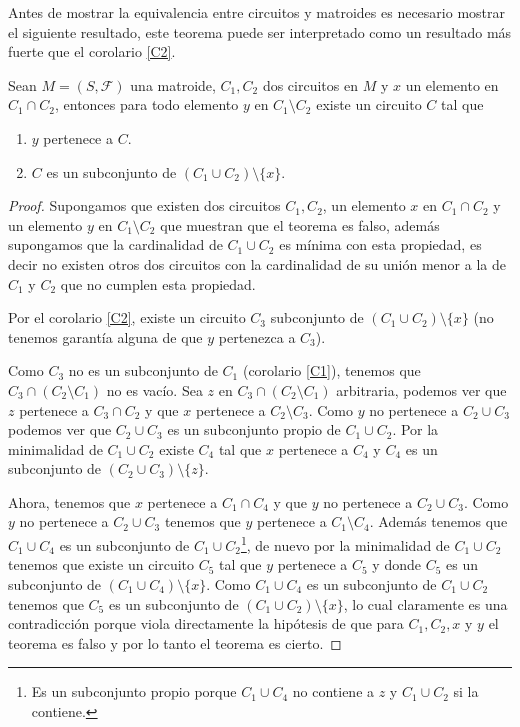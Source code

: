 Antes de mostrar la equivalencia entre circuitos y matroides es necesario mostrar el siguiente resultado, este teorema puede ser interpretado como un resultado más fuerte que el corolario \ref{C2}.

\begin{teo} \label{C3}
Sean $M=(S,\mathcal{F})$ una matroide, $C_1, C_2$ dos circuitos en $M$ y $x$ un elemento en $C_1 \cap C_2$, entonces para todo elemento $y$ en $C_1 \setminus C_2$ existe un circuito $C$ tal que 
\begin{enumerate}
\item $y$ pertenece a $C$.
\item $C$ es un subconjunto de $(C_1 \cup C_2) \setminus \{x\}$.
\end{enumerate}
\end{teo}

\begin{proof}
Supongamos que existen dos circuitos $C_1,C_2$, un elemento $x$ en $C_1 \cap C_2$ y un elemento $y$ en $C_1 \setminus C_2$ que muestran que el teorema es falso, además supongamos que la cardinalidad de $C_1 \cup C_2$ es mínima con esta propiedad, es decir no existen otros dos circuitos con la cardinalidad de su unión menor a la de $C_1$ y $C_2$ que no cumplen esta propiedad. 

Por el corolario \ref{C2}, existe un circuito $C_3$ subconjunto de $(C_1 \cup C_2)\setminus \{x\}$ (no tenemos garantía alguna de que $y$ pertenezca a $C_3$). 

Como $C_3$ no es un subconjunto de $C_1$ (corolario \ref{C1}), tenemos que $C_3 \cap (C_2\setminus C_1)$ no es vacío. Sea $z$ en $C_3 \cap (C_2\setminus C_1)$ arbitraria, podemos ver que $z$ pertenece a $C_3 \cap C_2$ y que $x$ pertenece a $C_2 \setminus C_3$. Como $y$ no pertenece a $C_2 \cup C_3$ podemos ver que $C_2 \cup C_3$ es un subconjunto propio de $C_1 \cup C_2$. Por la minimalidad de $C_1 \cup C_2$ existe $C_4$ tal que $x$ pertenece a $C_4$ y $C_4$ es un subconjunto de $(C_2 \cup C_3) \setminus \{z\}$. 

Ahora, tenemos que $x$ pertenece a $C_1 \cap C_4$ y que $y$ no pertenece a $C_2 \cup C_3$. Como $y$ no pertenece a $C_2 \cup C_3$ tenemos que $y$ pertenece a $C_1 \setminus C_4$. Además tenemos que $C_1 \cup C_4$ es un subconjunto de $C_1 \cup C_2$\footnote{Es un subconjunto propio porque $C_1 \cup C_4$ no contiene a $z$ y $C_1 \cup C_2$ si la contiene.}, de nuevo por la minimalidad de $C_1 \cup C_2$ tenemos que existe un circuito $C_5$ tal que $y$ pertenece a $C_5$ y donde $C_5$ es un subconjunto de $(C_1 \cup C_4) \setminus \{x\}$. Como $C_1 \cup C_4$ es un subconjunto de $C_1 \cup C_2$ tenemos que $C_5$ es un subconjunto de $(C_1 \cup C_2) \setminus \{x\}$, lo cual claramente es una contradicción porque viola directamente la hipótesis de que para $C_1,C_2,x$ y $y$ el teorema es falso y por lo tanto el teorema es cierto. 
\end{proof}

